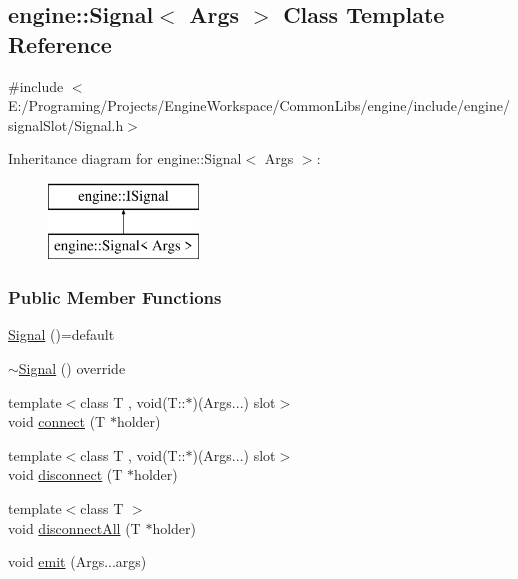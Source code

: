 \hypertarget{a00065}{}\subsection{engine\+:\+:Signal$<$ Args $>$ Class Template Reference}
\label{a00065}


{\ttfamily \#include $<$E\+:/\+Programing/\+Projects/\+Engine\+Workspace/\+Common\+Libs/engine/include/engine/signal\+Slot/\+Signal.\+h$>$}

Inheritance diagram for engine\+:\+:Signal$<$ Args $>$\+:\begin{figure}[H]
\begin{center}
\leavevmode
\includegraphics[height=2.000000cm]{a00065}
\end{center}
\end{figure}
\subsubsection*{Public Member Functions}
\begin{DoxyCompactItemize}
\item 
\hyperlink{a00065_ac27bc541be14d6ad516d858c3039df97}{Signal} ()=default
\item 
\hyperlink{a00065_a29c5d469f7f68d00e6895d1cf5121025}{$\sim$\+Signal} () override
\item 
{\footnotesize template$<$class T , void(\+T\+::$\ast$)(\+Args...) slot$>$ }\\void \hyperlink{a00065_aba0c679c2026a6ddaafdac1f6a71cb70}{connect} (T $\ast$holder)
\item 
{\footnotesize template$<$class T , void(\+T\+::$\ast$)(\+Args...) slot$>$ }\\void \hyperlink{a00065_a4dc6184edbd36dd8717d07c37a1f5fad}{disconnect} (T $\ast$holder)
\item 
{\footnotesize template$<$class T $>$ }\\void \hyperlink{a00065_a4f3a4fcb844c23af742eac03e26bbc1b}{disconnect\+All} (T $\ast$holder)
\item 
void \hyperlink{a00065_afbe3d238443fab207b5030ac8c77385c}{emit} (Args...\+args)
\end{DoxyCompactItemize}


